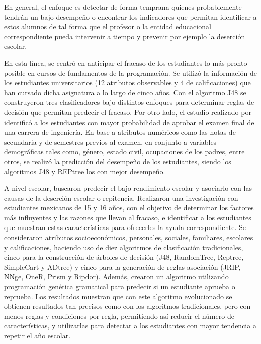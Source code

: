 En general, el enfoque es detectar de forma temprana quienes probablemente tendrán un bajo desempeño o encontrar los indicadores que permitan identificar a estos alumnos de tal forma que el profesor o la entidad educacional correspondiente pueda intervenir a tiempo y prevenir por ejemplo la deserción escolar. 

En esta línea, \textcite{antunes2010anticipating} se centró en anticipar el fracaso de los estudiantes lo más pronto posible en cursos de fundamentos de la programación. Se utilizó la información de los estudiantes universitarios (12 atributos observables y 4 de calificaciones) que han cursado dicha asignatura a lo largo de cinco años. Con el algoritmo J48 se construyeron tres clasificadores bajo distintos enfoques para determinar reglas de decisión que permitan predecir el fracaso. Por otro lado, el estudio realizado por \textcite{kumar2016predicting} identificó a los estudiantes con mayor probabilidad de aprobar el examen final de una carrera de ingeniería. En base a atributos numéricos como las notas de secundaria y de semestres previos al examen, en conjunto a variables demográficas tales como, género, estado civil, ocupaciones de los padres, entre otros, se realizó la predicción del desempeño de los estudiantes, siendo los algoritmos J48 y REPtree los con mejor desempeño.

A nivel escolar, \textcite{marquez2013predicting} buscaron predecir el bajo rendimiento escolar y asociarlo con las causas de la deserción escolar o repitencia. Realizaron una investigación con estudiantes mexicanos de 15 y 16 años, con el objetivo de determinar los factores más influyentes y las razones que llevan al fracaso, e identificar a los estudiantes que muestran estas características para ofrecerles la ayuda correspondiente. Se consideraron atributos socioeconómicos, personales, sociales, familiares, escolares y calificaciones, haciendo uso de diez algoritmos de clasificación tradicionales, cinco para la construcción de árboles de decisión (J48, RandomTree, Reptree, SimpleCart y ADtree) y cinco para la generación de reglas asociación (JRIP, NNge, OneR, Prism y Ripdor). Además, crearon un algoritmo utilizando programación genética gramatical para predecir si un estudiante aprueba o reprueba. Los resultados muestran que con este algoritmo evolucionado se obtienen resultados tan precisos como con los algoritmos tradicionales, pero con menos reglas y condiciones por regla, permitiendo así reducir el número de características, y utilizarlas para detectar a los estudiantes con mayor tendencia a repetir el año escolar.

